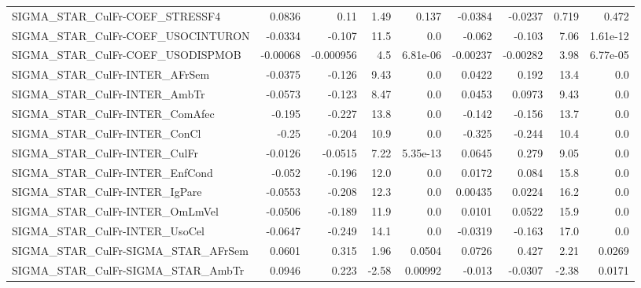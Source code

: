 \begin{tabular}{lrrrrrrrr}
SIGMA\_STAR\_CulFr-COEF\_STRESSF4        &      0.0836 &         0.11 &     1.49 &    0.137 &    -0.0384 &     -0.0237 &        0.719 &         0.472 \\
SIGMA\_STAR\_CulFr-COEF\_USOCINTURON     &     -0.0334 &       -0.107 &     11.5 &      0.0 &     -0.062 &      -0.103 &         7.06 &      1.61e-12 \\
SIGMA\_STAR\_CulFr-COEF\_USODISPMOB      &    -0.00068 &    -0.000956 &      4.5 & 6.81e-06 &   -0.00237 &    -0.00282 &         3.98 &      6.77e-05 \\
SIGMA\_STAR\_CulFr-INTER\_AFrSem         &     -0.0375 &       -0.126 &     9.43 &      0.0 &     0.0422 &       0.192 &         13.4 &           0.0 \\
SIGMA\_STAR\_CulFr-INTER\_AmbTr          &     -0.0573 &       -0.123 &     8.47 &      0.0 &     0.0453 &      0.0973 &         9.43 &           0.0 \\
SIGMA\_STAR\_CulFr-INTER\_ComAfec        &      -0.195 &       -0.227 &     13.8 &      0.0 &     -0.142 &      -0.156 &         13.7 &           0.0 \\
SIGMA\_STAR\_CulFr-INTER\_ConCl          &       -0.25 &       -0.204 &     10.9 &      0.0 &     -0.325 &      -0.244 &         10.4 &           0.0 \\
SIGMA\_STAR\_CulFr-INTER\_CulFr          &     -0.0126 &      -0.0515 &     7.22 & 5.35e-13 &     0.0645 &       0.279 &         9.05 &           0.0 \\
SIGMA\_STAR\_CulFr-INTER\_EnfCond        &      -0.052 &       -0.196 &     12.0 &      0.0 &     0.0172 &       0.084 &         15.8 &           0.0 \\
SIGMA\_STAR\_CulFr-INTER\_IgPare         &     -0.0553 &       -0.208 &     12.3 &      0.0 &    0.00435 &      0.0224 &         16.2 &           0.0 \\
SIGMA\_STAR\_CulFr-INTER\_OmLmVel        &     -0.0506 &       -0.189 &     11.9 &      0.0 &     0.0101 &      0.0522 &         15.9 &           0.0 \\
SIGMA\_STAR\_CulFr-INTER\_UsoCel         &     -0.0647 &       -0.249 &     14.1 &      0.0 &    -0.0319 &      -0.163 &         17.0 &           0.0 \\
SIGMA\_STAR\_CulFr-SIGMA\_STAR\_AFrSem    &      0.0601 &        0.315 &     1.96 &   0.0504 &     0.0726 &       0.427 &         2.21 &        0.0269 \\
SIGMA\_STAR\_CulFr-SIGMA\_STAR\_AmbTr     &      0.0946 &        0.223 &    -2.58 &  0.00992 &     -0.013 &     -0.0307 &        -2.38 &        0.0171 \\

\end{tabular}
